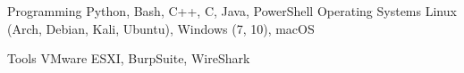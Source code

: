 

\begin{cvskills}

  \cvskill
    {Programming} %
    {Python, Bash, C++, C, Java, PowerShell} %
  \cvskill
    {Operating Systems} %
    {Linux (Arch, Debian, Kali, Ubuntu), Windows (7, 10), macOS} %

\cvskill
  {Tools} %
  {VMware ESXI, BurpSuite, WireShark} %
\end{cvskills}
